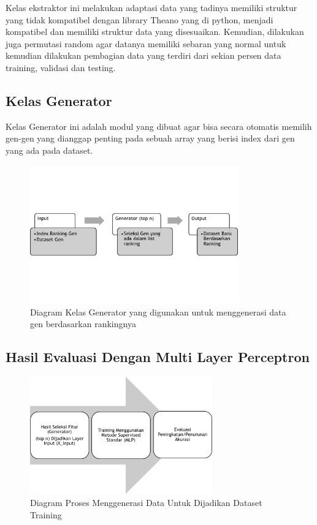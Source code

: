 Kelas ekstraktor ini melakukan adaptasi data yang tadinya memiliki struktur yang tidak kompatibel dengan library Theano yang di python, menjadi kompatibel dan memiliki struktur data yang disesuaikan. Kemudian, dilakukan juga permutasi random agar datanya memiliki sebaran yang normal untuk kemudian dilakukan pembagian data yang terdiri dari sekian persen data training, validasi dan testing.

\subsection{Kelas Generator}
Kelas Generator ini adalah modul yang dibuat agar bisa secara otomatis memilih gen-gen yang dianggap penting pada sebuah array yang berisi index dari gen yang ada pada dataset.
\begin{figure}
	\centering
	\includegraphics[width=0.8\textwidth]
		{pics/generator.png}
	\caption{Diagram Kelas Generator yang digunakan untuk menggenerasi data gen berdasarkan rankingnya}
	\label{fig:generator}
\end{figure}


\subsection{Hasil Evaluasi Dengan Multi Layer Perceptron}

\begin{figure}
	\centering
	\includegraphics[width=0.7\textwidth]
		{pics/generator2.png}
	\caption{Diagram Proses Menggenerasi Data Untuk Dijadikan Dataset Training}
	\label{fig:generator2}
\end{figure}






